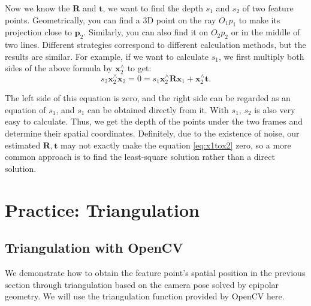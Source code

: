 Now we know the $\mathbf{R}$ and $\mathbf{t}$, we want to find the depth $s_1$ and $s_2$ of two feature points. Geometrically, you can find a 3D point on the ray $O_1 p_1$ to make its projection close to $\mathbf{p}_2$. Similarly, you can also find it on $O_2 p_2$ or in the middle of two lines. Different strategies correspond to different calculation methods, but the results are similar. For example, if we want to calculate $s_1$, we first multiply both sides of the above formula by $\mathbf{x}_2^\wedge$ to get:
\begin{equation}
\label{eq:x1tox2}
s_2 \mathbf{x}_2^\wedge \mathbf{x}_2 = 0 = s_1 \mathbf{x}_2^\wedge \mathbf{R} \mathbf{x}_1 + \mathbf{x}_2^\wedge \mathbf{t}. 
\end{equation}

The left side of this equation is zero, and the right side can be regarded as an equation of $s_1$, and $s_1$ can be obtained directly from it. With $s_1$, $s_2$ is also very easy to calculate. Thus, we get the depth of the points under the two frames and determine their spatial coordinates. Definitely, due to the existence of noise, our estimated $\mathbf{R}, \mathbf{t}$ may not exactly make the equation \eqref{eq:x1tox2} zero, so a more common approach is to find the least-square solution rather than a direct solution.

\section{Practice: Triangulation}
\subsection{Triangulation with OpenCV}
We demonstrate how to obtain the feature point's spatial position in the previous section through triangulation based on the camera pose solved by epipolar geometry. We will use the triangulation function provided by OpenCV here.

